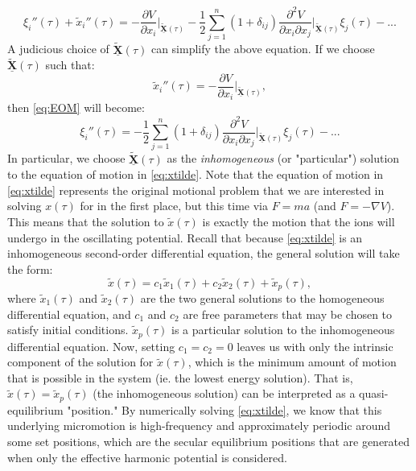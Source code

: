 \documentclass{article}
\begin{document}
\begin{equation}
\xi_i''(\tau)  + \tilde{x}_i''(\tau) = 	- \frac{\partial V}{\partial x_i} \Biggr|_{\underline{\boldsymbol{\tilde{X}}} (\tau)} - \frac{1}{2}\sum_{j = 1}^n (1 + \delta_{ij}) \frac{\partial^2 V}{\partial x_i \partial x_j} \Biggl|_{\underline{\boldsymbol{\tilde{X}}} (\tau)}	 \xi_j (\tau) - ...
\label{eq:EOM}
\end{equation}
A judicious choice of $\underline{\boldsymbol{\tilde{X}}} (\tau)$ can simplify the above equation. If we choose $\underline{\boldsymbol{\tilde{X}}} (\tau)$ such that:
\begin{equation}
	\tilde{x}_i''(\tau) = - \frac{\partial V}{\partial x_i} \Biggr|_{\underline{\boldsymbol{\tilde{X}}} (\tau)},
	\label{eq:xtilde}
\end{equation}
then \eqref{eq:EOM} will become:
\begin{equation}
	\xi_i''(\tau) = - \frac{1}{2}\sum_{j = 1}^n (1 + \delta_{ij}) \frac{\partial^2 V}{\partial x_i \partial x_j} \Biggl|_{\underline{\boldsymbol{\tilde{X}}} (\tau)}	 \xi_j (\tau) - ...
	\label{eq:simpleEOM}
\end{equation}
In particular, we choose $\underline{\boldsymbol{\tilde{X}}} (\tau)$ as the \textit{inhomogeneous} (or "particular") solution to the equation of motion in \eqref{eq:xtilde}. Note that the equation of motion in \eqref{eq:xtilde} represents the original motional problem that we are interested in solving $x (\tau)$ for in the first place, but this time via $F = ma$ (and $F = - \nabla V$). This means that the solution to $\tilde{x} (\tau)$ is exactly the motion that the ions will undergo in the oscillating potential. Recall that because \eqref{eq:xtilde} is an inhomogeneous second-order differential equation, the general solution will take the form:
\begin{equation}
\tilde{x} (\tau) = c_1 \tilde{x}_1 (\tau) + c_2 \tilde{x}_2 (\tau) + \tilde{x}_p (\tau)	 ,
\end{equation}
where $\tilde{x}_1 (\tau)$ and $\tilde{x}_2 (\tau)$ are the two general solutions to the homogeneous differential equation, and $c_1$ and $c_2$ are free parameters that may be chosen to satisfy initial conditions. $\tilde{x}_p (\tau)$ is a particular solution to the inhomogeneous differential equation. Now, setting $c_1 = c_2 = 0$ leaves us with only the intrinsic component of the solution for $\tilde{x} (\tau)$, which is the minimum amount of motion that is possible in the system (ie. the lowest energy solution). That is, $\tilde{x} (\tau) = \tilde{x}_p (\tau)$ (the inhomogeneous solution) can be interpreted as a quasi-equilibrium "position." By numerically solving \eqref{eq:xtilde}, we know that this underlying micromotion is high-frequency and approximately periodic around some set positions, which are the secular equilibrium positions that are generated when only the effective harmonic potential is considered. \par
\end{document}
